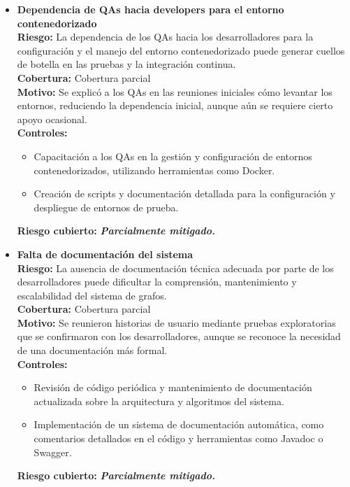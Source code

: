 \documentclass[stu, 12pt, letterpaper, donotrepeattitle, floatsintext, natbib]{apa7}
\begin{document}
\begin{itemize}
    \item \textbf{Dependencia de QAs hacia developers para el entorno contenedorizado} \\ 
    \textbf{Riesgo:} La dependencia de los QAs hacia los desarrolladores para la configuración y el manejo del entorno contenedorizado puede generar cuellos de botella en las pruebas y la integración continua. \\ 
    \textbf{Cobertura:} Cobertura parcial \\ 
    \textbf{Motivo:} Se explicó a los QAs en las reuniones iniciales cómo levantar los entornos, reduciendo la dependencia inicial, aunque aún se requiere cierto apoyo ocasional. \\ 
    \textbf{Controles:} 
    \begin{itemize}
      \item Capacitación a los QAs en la gestión y configuración de entornos contenedorizados, utilizando herramientas como Docker.
      \item Creación de scripts y documentación detallada para la configuración y despliegue de entornos de prueba.
    \end{itemize}
    \textbf{Riesgo cubierto:} \textbf{\textit{Parcialmente mitigado.}} 
    
    \item \textbf{Falta de documentación del sistema} \\ 
    \textbf{Riesgo:} La ausencia de documentación técnica adecuada por parte de los desarrolladores puede dificultar la comprensión, mantenimiento y escalabilidad del sistema de grafos. \\ 
    \textbf{Cobertura:} Cobertura parcial \\ 
    \textbf{Motivo:} Se reunieron historias de usuario mediante pruebas exploratorias que se confirmaron con los desarrolladores, aunque se reconoce la necesidad de una documentación más formal. \\ 
    \textbf{Controles:} 
    \begin{itemize}
      \item Revisión de código periódica y mantenimiento de documentación actualizada sobre la arquitectura y algoritmos del sistema.
      \item Implementación de un sistema de documentación automática, como comentarios detallados en el código y herramientas como Javadoc o Swagger.
    \end{itemize}
    \textbf{Riesgo cubierto:} \textbf{\textit{Parcialmente mitigado.}} 
    
\end{itemize}
\end{document}
